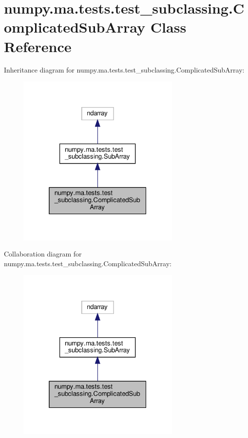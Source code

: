 \hypertarget{classnumpy_1_1ma_1_1tests_1_1test__subclassing_1_1ComplicatedSubArray}{}\section{numpy.\+ma.\+tests.\+test\+\_\+subclassing.\+Complicated\+Sub\+Array Class Reference}
\label{classnumpy_1_1ma_1_1tests_1_1test__subclassing_1_1ComplicatedSubArray}


Inheritance diagram for numpy.\+ma.\+tests.\+test\+\_\+subclassing.\+Complicated\+Sub\+Array\+:
\nopagebreak
\begin{figure}[H]
\begin{center}
\leavevmode
\includegraphics[width=229pt]{classnumpy_1_1ma_1_1tests_1_1test__subclassing_1_1ComplicatedSubArray__inherit__graph}
\end{center}
\end{figure}


Collaboration diagram for numpy.\+ma.\+tests.\+test\+\_\+subclassing.\+Complicated\+Sub\+Array\+:
\nopagebreak
\begin{figure}[H]
\begin{center}
\leavevmode
\includegraphics[width=229pt]{classnumpy_1_1ma_1_1tests_1_1test__subclassing_1_1ComplicatedSubArray__coll__graph}
\end{center}
\end{figure}
